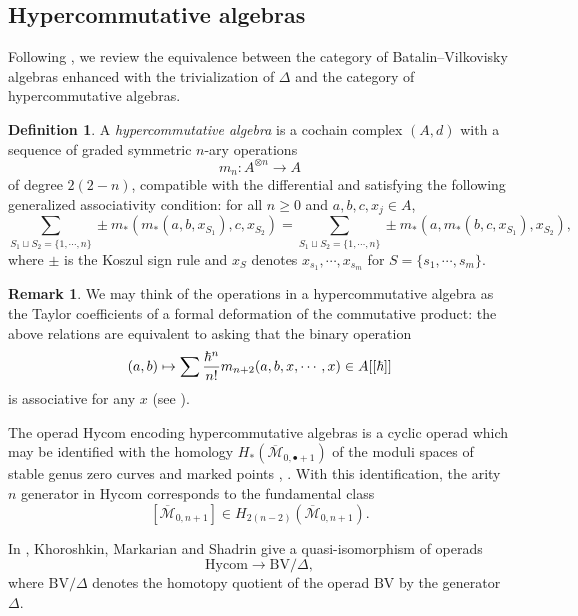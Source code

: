 \documentclass[a4paper]{amsart}
\theoremstyle{definition}
\newtheorem{defi}[theo]{Definition}
\newtheorem{rema}[theo]{Remark}
\theoremstyle{theorem}
\newcommand{\Mm}{\mathcal{M}}
\newcommand{\ov}{\overline}
\newcommand{\lra}{\longrightarrow}
\newcommand{\BV}{{\mathrm{BV}}}
\newcommand{\Hycom}{{\mathrm{Hycom}}}
\begin{document}
\subsection{Hypercommutative algebras}\label{BVtoHycom}
Following \cite{KMS}, we review the equivalence between the category of Batalin--Vilkovisky algebras enhanced with the trivialization of $\Delta$  and the category of hypercommutative algebras.

\begin{defi}
A \textit{hypercommutative algebra} is a cochain complex $(A,d)$ with a sequence of
graded
symmetric $n$-ary operations
\[m_n:A^{\otimes n}\to A\] of degree $2(2-n)$, compatible with the differential and
satisfying the following generalized associativity condition:
for all $n\geq 0$ and $a,b,c,x_j\in A$, 
\[\sum_{S_1\sqcup S_2=\{1,\cdots,n\}} \pm m_*(m_*(a,b,x_{S_1}),c,x_{S_2})=
\sum_{S_1\sqcup S_2=\{1,\cdots,n\}} \pm m_*(a,m_*(b,c,x_{S_1}),x_{S_2}),
\]
where $\pm$ is the Koszul sign rule and $x_S$ denotes $x_{s_1},\cdots,x_{s_m}$ for 
$S=\{s_1,\cdots,s_m\}$.
\end{defi}

\begin{rema}
We may think of the operations in a hypercommutative algebra as the Taylor coefficients
of a formal deformation of the commutative product: the above relations are equivalent
to asking that the binary operation 
\[(a,b)\mapsto \sum {\hbar^n\over n!} m_{n+2}(a,b,x,\cdots,x)\in A[[\hbar]]\]
is associative for any $x$ (see \cite{Getzler}).
\end{rema}
 
 
 
The operad 
$\Hycom$ encoding hypercommutative algebras is a cyclic operad which may be identified with the homology  $H_*(\ov{\Mm}_{0,\bullet+1})$
of the moduli spaces of stable genus zero curves and marked points \cite{Getzler}, \cite{KoMa}. With this identification,
the arity $n$ generator in $\mathrm{Hycom}$  corresponds to the fundamental 
class \[[\ov{\Mm}_{0,n+1}]\in H_{2(n-2)}(\ov{\Mm}_{0,n+1}).\] 

In \cite{KMS}, Khoroshkin,  Markarian and Shadrin
give a quasi-isomorphism of operads \[\mathrm{Hycom}\lra \BV/\Delta,\] where 
$\BV/\Delta$ denotes the homotopy quotient of the operad $\BV$ by the generator $\Delta$.
\end{document}
